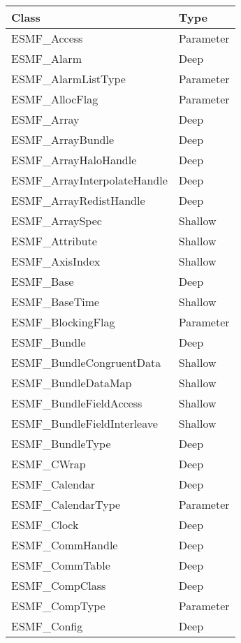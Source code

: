\begin{table}[t]
\begin{tabular}{ll}

{\bf Class} & {\bf Type} \\ \hline

ESMF\_Access               &  Parameter \\
ESMF\_Alarm                &  Deep \\
ESMF\_AlarmListType        & Parameter \\
ESMF\_AllocFlag            &  Parameter \\
ESMF\_Array                & Deep \\
ESMF\_ArrayBundle          &  Deep \\
ESMF\_ArrayHaloHandle       & Deep \\
ESMF\_ArrayInterpolateHandle & Deep \\
ESMF\_ArrayRedistHandle     & Deep \\
ESMF\_ArraySpec             & Shallow\\
ESMF\_Attribute             & Shallow\\
ESMF\_AxisIndex             & Shallow\\
ESMF\_Base                  & Deep \\
ESMF\_BaseTime              & Shallow\\
ESMF\_BlockingFlag          & Parameter \\
ESMF\_Bundle                & Deep \\
ESMF\_BundleCongruentData   & Shallow\\
ESMF\_BundleDataMap         & Shallow\\
ESMF\_BundleFieldAccess     & Shallow\\
ESMF\_BundleFieldInterleave & Shallow\\
ESMF\_BundleType            & Deep \\ 
ESMF\_CWrap                 & Deep \\
ESMF\_Calendar              & Deep \\
ESMF\_CalendarType          & Parameter \\
ESMF\_Clock                 & Deep \\
ESMF\_CommHandle            & Deep \\
ESMF\_CommTable             & Deep \\
ESMF\_CompClass             & Deep \\
ESMF\_CompType              & Parameter \\
ESMF\_Config                & Deep \\

\end{tabular}
\end{table}
